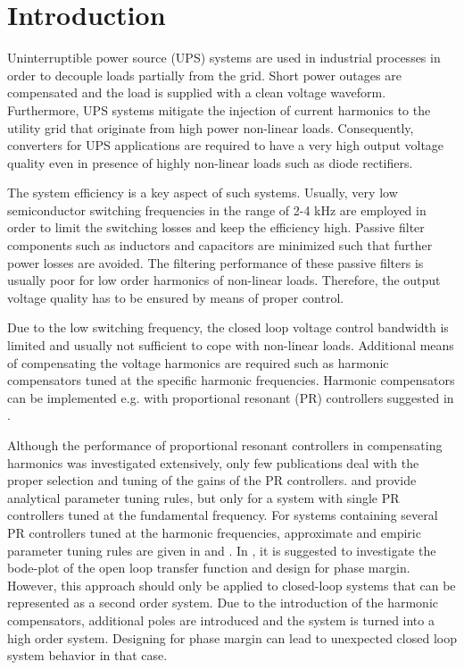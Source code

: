 \documentclass[conference,10pt]{IEEEtran}
\begin{document}
\IEEEpeerreviewmaketitle


\section{Introduction}
Uninterruptible power source (UPS) systems are used in industrial processes in order to decouple loads partially from the grid. Short power outages are compensated and the load is supplied with a clean voltage waveform. Furthermore, UPS systems mitigate the injection of current harmonics to the utility grid that originate from high power non-linear loads.  Consequently, converters for UPS applications are required to have a very high output voltage quality even in presence of highly non-linear loads such as diode rectifiers.

The system efficiency is a key aspect of such systems. Usually, very low semiconductor switching frequencies in the range of 2-4 kHz are employed in order to limit the switching losses and keep the efficiency high. Passive filter components such as inductors and capacitors are minimized such that further power losses are avoided. The filtering performance of these passive filters is usually poor for low order harmonics of non-linear loads. Therefore, the output voltage quality has to be ensured by means of proper control.

Due to the low switching frequency, the closed loop voltage control bandwidth is limited and usually not sufficient to cope with non-linear loads. Additional means of compensating the voltage harmonics are required such as harmonic compensators tuned at the specific harmonic frequencies. Harmonic compensators can be implemented e.g. with proportional resonant (PR) controllers suggested in \cite{924769,4270758,6408064,6153368,993175,5398914,989372}.

Although the performance of proportional resonant controllers in compensating harmonics was investigated extensively, only few publications deal with the proper selection and tuning of the gains of the PR controllers. \cite{5338054} and \cite{6870109} provide analytical parameter tuning rules, but only for a system with single PR controllers tuned at the fundamental frequency. For systems containing several PR controllers tuned at the harmonic frequencies, approximate and empiric parameter tuning rules are given in \cite{924769} and \cite{6153368}. In \cite{5398914}, it is suggested to investigate the bode-plot of the open loop transfer function and design for phase margin. However, this approach should only be applied to closed-loop systems that can be represented as a second order system. Due to the introduction of the harmonic compensators, additional poles are introduced and the system is turned into a high order system. Designing for phase margin can lead to unexpected closed loop system behavior in that case.
\end{document}
